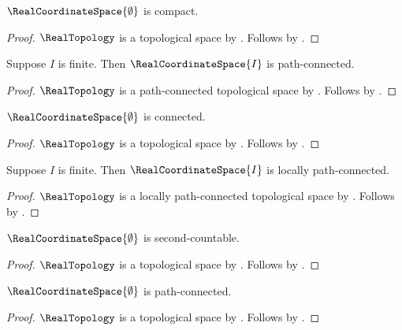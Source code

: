 \begin{theorem}\label{real_zero_coordinate_space_is_compact}
    $\RealCoordinateSpace{\emptyset}$ is compact.
\end{theorem}
\begin{proof}
    $\RealTopology$ is a topological space by .
    Follows by .
\end{proof}

\begin{theorem}\label{real_coordinate_space_is_path_connected}
    Suppose $I$ is finite.
    Then $\RealCoordinateSpace{I}$ is path-connected.
\end{theorem}
\begin{proof}
    $\RealTopology$ is a path-connected topological space by
        .
    Follows by .
\end{proof}

\begin{theorem}\label{real_zero_coordinate_space_is_connected}
    $\RealCoordinateSpace{\emptyset}$ is connected.
\end{theorem}
\begin{proof}
    $\RealTopology$ is a topological space by .
    Follows by .
\end{proof}

\begin{theorem}\label{real_coordinate_space_is_locally_path_connected}
    Suppose $I$ is finite.
    Then $\RealCoordinateSpace{I}$ is locally path-connected.
\end{theorem}
\begin{proof}
    $\RealTopology$ is a locally path-connected topological space by
        .
    Follows by .
\end{proof}

\begin{theorem}\label{real_zero_coordinate_space_is_second_countable}
    $\RealCoordinateSpace{\emptyset}$ is second-countable.
\end{theorem}
\begin{proof}
    $\RealTopology$ is a topological space by .
    Follows by .
\end{proof}

\begin{theorem}\label{real_zero_coordinate_space_is_path_connected}
    $\RealCoordinateSpace{\emptyset}$ is path-connected.
\end{theorem}
\begin{proof}
    $\RealTopology$ is a topological space by .
    Follows by .
\end{proof}
